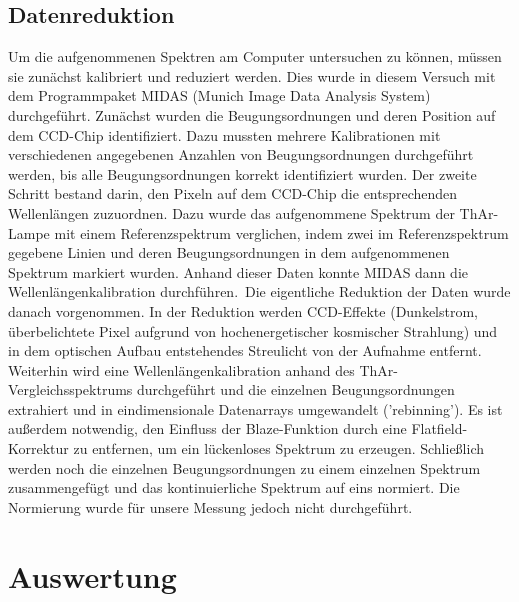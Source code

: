 \subsection{Datenreduktion}
Um die aufgenommenen Spektren am Computer untersuchen zu können, müssen sie zunächst kalibriert und reduziert werden. Dies wurde in diesem Versuch mit dem Programmpaket MIDAS (Munich Image Data Analysis System) durchgeführt. Zunächst wurden die Beugungsordnungen und deren Position auf dem CCD-Chip identifiziert. Dazu mussten mehrere Kalibrationen mit verschiedenen angegebenen Anzahlen von Beugungsordnungen durchgeführt werden, bis alle Beugungsordnungen korrekt identifiziert wurden. Der zweite Schritt bestand darin, den Pixeln auf dem CCD-Chip die entsprechenden Wellenlängen zuzuordnen. Dazu wurde das aufgenommene Spektrum der ThAr-Lampe mit einem Referenzspektrum verglichen, indem zwei im Referenzspektrum gegebene Linien und deren Beugungsordnungen in dem aufgenommenen Spektrum markiert wurden. Anhand dieser Daten konnte MIDAS dann die Wellenlängenkalibration durchführen.\
Die eigentliche Reduktion der Daten wurde danach vorgenommen. In der Reduktion werden CCD-Effekte (Dunkelstrom, überbelichtete Pixel aufgrund von hochenergetischer kosmischer Strahlung) und in dem optischen Aufbau entstehendes Streulicht von der Aufnahme entfernt. Weiterhin wird eine Wellenlängenkalibration anhand des ThAr-Vergleichsspektrums durchgeführt und die einzelnen Beugungsordnungen extrahiert und in eindimensionale Datenarrays umgewandelt ('rebinning'). Es ist außerdem notwendig, den Einfluss der Blaze-Funktion durch eine Flatfield-Korrektur zu entfernen, um ein lückenloses Spektrum zu erzeugen. Schließlich werden noch die einzelnen Beugungsordnungen zu einem einzelnen Spektrum zusammengefügt und das kontinuierliche Spektrum auf eins normiert. Die Normierung wurde für unsere Messung jedoch nicht durchgeführt.  

\section{Auswertung}
